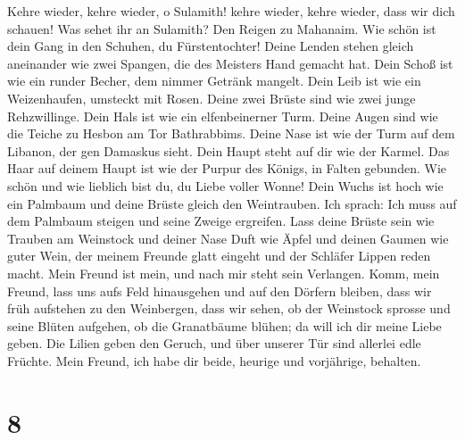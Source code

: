  Kehre wieder, kehre wieder, o Sulamith! kehre wieder,
kehre wieder, dass wir dich schauen! Was sehet ihr an Sulamith? Den
Reigen zu Mahanaim.  Wie schön ist dein Gang in den
Schuhen, du Fürstentochter! Deine Lenden stehen gleich aneinander wie
zwei Spangen, die des Meisters Hand gemacht hat.  Dein
Schoß ist wie ein runder Becher, dem nimmer Getränk mangelt. Dein Leib
ist wie ein Weizenhaufen, umsteckt mit Rosen.  Deine zwei
Brüste sind wie zwei junge Rehzwillinge.  Dein Hals ist
wie ein elfenbeinerner Turm. Deine Augen sind wie die Teiche zu Hesbon
am Tor Bathrabbims. Deine Nase ist wie der Turm auf dem Libanon, der gen
Damaskus sieht.  Dein Haupt steht auf dir wie der Karmel.
Das Haar auf deinem Haupt ist wie der Purpur des Königs, in Falten
gebunden.  Wie schön und wie lieblich bist du, du Liebe
voller Wonne!  Dein Wuchs ist hoch wie ein Palmbaum und
deine Brüste gleich den Weintrauben.  Ich sprach: Ich muss
auf dem Palmbaum steigen und seine Zweige ergreifen. Lass deine Brüste
sein wie Trauben am Weinstock und deiner Nase Duft wie Äpfel
 und deinen Gaumen wie guter Wein, der meinem Freunde
glatt eingeht und der Schläfer Lippen reden macht.  Mein
Freund ist mein, und nach mir steht sein Verlangen. 
Komm, mein Freund, lass uns aufs Feld hinausgehen und auf den Dörfern
bleiben,  dass wir früh aufstehen zu den Weinbergen, dass
wir sehen, ob der Weinstock sprosse und seine Blüten aufgehen, ob die
Granatbäume blühen; da will ich dir meine Liebe geben. 
Die Lilien geben den Geruch, und über unserer Tür sind allerlei edle
Früchte. Mein Freund, ich habe dir beide, heurige und vorjährige,
behalten.

\hypertarget{section-7}{%
\section{8}\label{section-7}}

